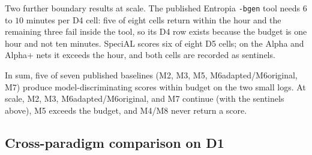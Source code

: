 \documentclass[runningheads]{llncs}
\newcommand{\chg}[1]{\textcolor{chgblue}{#1}}
\begin{document}
\chg{Two further boundary results at scale. The published Entropia \texttt{-bgen} tool needs $6$ to $10$ minutes per D4 cell: five of eight cells return within the hour and the remaining three fail inside the tool, so its D4 row exists because the budget is one hour and not ten minutes. SpeciAL scores six of eight D5 cells; on the Alpha and Alpha+ nets it exceeds the hour, and both cells are recorded as sentinels.}

\chg{In sum, five of seven published baselines (M2, M3, M5, M6adapted/M6original, M7) produce model-discriminating scores within budget on the two small logs. At scale, M2, M3, M6adapted/M6original, and M7 continue (with the sentinels above), M5 exceeds the budget, and M4/M8 never return a score.}

\subsection{Cross-paradigm comparison on D1}
\label{sec:eval:external}
\end{document}

